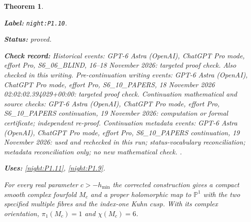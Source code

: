 \documentclass[11pt,a4paper]{article}
\newtheorem{theorem}{Theorem}[section]
\theoremstyle{definition}
\newcommand{\StatementRecord}[4]{\par\smallskip\begingroup\upshape\raggedright\noindent\textbf{Label:} \nolinkurl{#1}.\par\noindent\textbf{Status:} #2.\par\noindent\textbf{Check record:} #3.\par\noindent\textbf{Uses:} #4.\par\endgroup\smallskip}
\begin{document}
\begin{theorem}\label{night:P1.10}
\StatementRecord{night:P1.10}{proved}{Historical events: GPT-6 Astra (OpenAI), ChatGPT Pro mode, effort Pro, S6\_06\_BLIND, 16--18 November 2026: targeted proof check. Also checked in this writing. Pre-continuation writing events: GPT-6 Astra (OpenAI), ChatGPT Pro mode, effort Pro, S6\_10\_PAPERS, 18 November 2026 02:02:02.394029+00:00: targeted proof check. Continuation mathematical and source checks: GPT-6 Astra (OpenAI), ChatGPT Pro mode, effort Pro, S6\_10\_PAPERS continuation, 19 November 2026: computation or formal certificate; independent re-proof. Continuation metadata events: GPT-6 Astra (OpenAI), ChatGPT Pro mode, effort Pro, S6\_10\_PAPERS continuation, 19 November 2026: used and rechecked in this run; status-vocabulary reconciliation; metadata reconciliation only; no new mathematical check. }{\cref{night:P1.11}, \cref{night:P1.9}}
For every real parameter $c>-h_{\min}$ the corrected construction gives
a compact smooth complex fourfold $M_c$ and a proper holomorphic map
to $\mathbb P^1$ with the two specified multiple fibres and the
index-one Kuhn cusp.  With its complex orientation,
$\pi_1(M_c)=1$ and $\chi(M_c)=6$.
\end{theorem}
\end{document}
